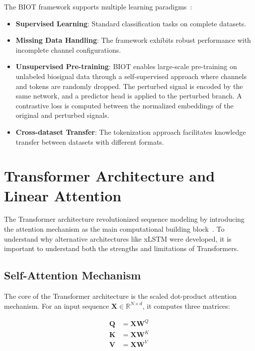 The \ac{BIOT} framework supports multiple learning paradigms~\cite{yang2023biot}:

\begin{itemize}
    \item \textbf{Supervised Learning}: Standard classification tasks on complete datasets.
    \item \textbf{Missing Data Handling}: The framework exhibits robust performance with incomplete channel configurations.
    \item \textbf{Unsupervised Pre-training}: \ac{BIOT} enables large-scale pre-training on unlabeled biosignal data through a self-supervised approach where channels and tokens are randomly dropped. The perturbed signal is encoded by the same network, and a predictor head is applied to the perturbed branch. A contrastive loss is computed between the normalized embeddings of the original and perturbed signals.
    \item \textbf{Cross-dataset Transfer}: The tokenization approach facilitates knowledge transfer between datasets with different formats.
\end{itemize}


\section{Transformer Architecture and Linear Attention}
\label{sec:background:transformer}

The Transformer architecture revolutionized sequence modeling by introducing the attention mechanism as the main computational building block~\cite{vaswani2017attention}. To understand why alternative architectures like \ac{xLSTM} were developed, it is important to understand both the strengths and limitations of Transformers.

\subsection{Self-Attention Mechanism}

The core of the Transformer architecture is the scaled dot-product attention mechanism. For an input sequence $\mathbf{X} \in \mathbb{R}^{N \times d}$, it computes three matrices:

\begin{align}
\mathbf{Q} &= \mathbf{X}\mathbf{W}^Q \\
\mathbf{K} &= \mathbf{X}\mathbf{W}^K \\
\mathbf{V} &= \mathbf{X}\mathbf{W}^V
\end{align}

